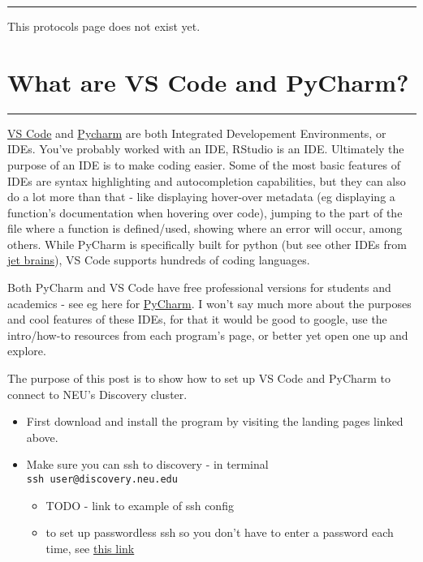 \documentclass[
  letterpaper,
  DIV=11,
  numbers=noendperiod]{scrreprt}
\begin{document}
\begin{center}\rule{0.5\linewidth}{0.5pt}\end{center}

This protocols page does not exist yet.

\hypertarget{what-are-vs-code-and-pycharm}{%
\chapter{What are VS Code and
PyCharm?}\label{what-are-vs-code-and-pycharm}}

\begin{center}\rule{0.5\linewidth}{0.5pt}\end{center}

\href{https://code.visualstudio.com/}{VS Code} and
\href{https://www.jetbrains.com/pycharm/}{Pycharm} are both Integrated
Developement Environments, or IDEs. You've probably worked with an IDE,
RStudio is an IDE. Ultimately the purpose of an IDE is to make coding
easier. Some of the most basic features of IDEs are syntax highlighting
and autocompletion capabilities, but they can also do a lot more than
that - like displaying hover-over metadata (eg displaying a function's
documentation when hovering over code), jumping to the part of the file
where a function is defined/used, showing where an error will occur,
among others. While PyCharm is specifically built for python (but see
other IDEs from \href{https://www.jetbrains.com/}{jet brains}), VS Code
supports hundreds of coding languages.

Both PyCharm and VS Code have free professional versions for students
and academics - see eg here for
\href{https://www.jetbrains.com/community/education/\#students}{PyCharm}.
I won't say much more about the purposes and cool features of these
IDEs, for that it would be good to google, use the intro/how-to
resources from each program's page, or better yet open one up and
explore.

The purpose of this post is to show how to set up VS Code and PyCharm to
connect to NEU's Discovery cluster.

\begin{itemize}
\item
  First download and install the program by visiting the landing pages
  linked above.
\item
  Make sure you can ssh to discovery - in terminal
  \texttt{ssh\ user@discovery.neu.edu}

  \begin{itemize}
  \item
    TODO - link to example of ssh config
  \item
    to set up passwordless ssh so you don't have to enter a password
    each time, see \href{http://www.linuxproblem.org/art_9.html}{this
    link}
  \end{itemize}
\end{itemize}
\end{document}
